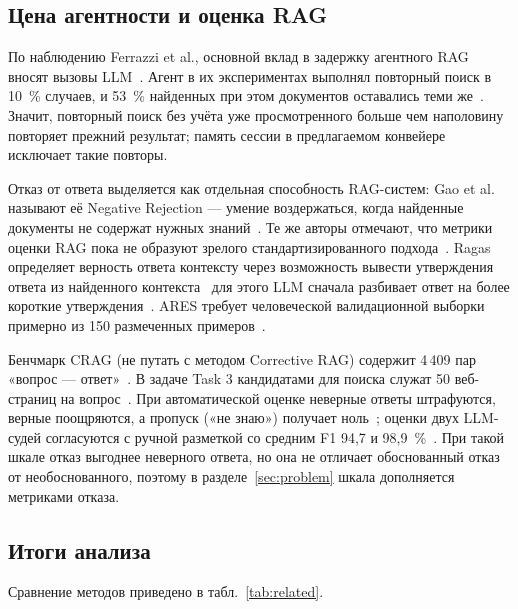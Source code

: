 \documentclass{misisarticle}
\begin{document}
\subsection{Цена агентности и оценка RAG}

По наблюдению Ferrazzi et al., основной вклад в задержку агентного RAG вносят вызовы LLM~\cite{ferrazzi2026agentic}. %
Агент в их экспериментах выполнял повторный поиск в 10~\% случаев, и 53~\% найденных при этом документов оставались теми же~\cite{ferrazzi2026agentic}. %
Значит, повторный поиск без учёта уже просмотренного больше чем наполовину повторяет прежний результат; память сессии в предлагаемом конвейере исключает такие повторы.

Отказ от ответа выделяется как отдельная способность RAG-систем: Gao et al. называют её Negative Rejection --- умение воздержаться, когда найденные документы не содержат нужных знаний~\cite{gao2023retrieval}. %
Те же авторы отмечают, что метрики оценки RAG пока не образуют зрелого стандартизированного подхода~\cite{gao2023retrieval}. %
Ragas определяет верность ответа контексту через возможность вывести утверждения ответа из найденного контекста~\cite{es2024ragas} %
для этого LLM сначала разбивает ответ на более короткие утверждения~\cite{es2024ragas}. %
ARES требует человеческой валидационной выборки примерно из 150 размеченных примеров~\cite{saadfalcon2024aresautomated}. %

Бенчмарк CRAG (не путать с методом Corrective RAG) содержит 4\,409 пар «вопрос --- ответ»~\cite{yang2024crag}. %
В задаче Task 3 кандидатами для поиска служат 50 веб-страниц на вопрос~\cite{yang2024crag}. %
При автоматической оценке неверные ответы штрафуются, верные поощряются, а пропуск («не знаю») получает ноль~\cite{yang2024crag}; %
оценки двух LLM-судей согласуются с ручной разметкой со средним F1 94,7 и 98,9~\%~\cite{yang2024crag}. %
При такой шкале отказ выгоднее неверного ответа, но она не отличает обоснованный отказ от необоснованного, поэтому в разделе~\ref{sec:problem} шкала дополняется метриками отказа.

\subsection{Итоги анализа}

Сравнение методов приведено в табл.~\ref{tab:related}.
\end{document}
